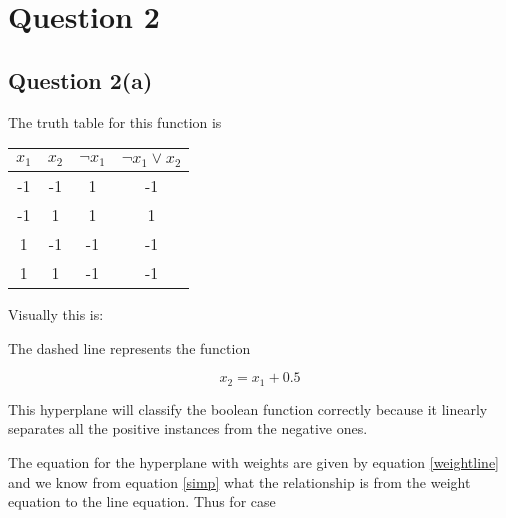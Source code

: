 \documentclass[10pt,a4paper]{article}
\begin{document}
\section{Question 2}
\subsection{Question 2(a)}

The truth table for this function is
 
\begin{tabular}{|c|c|c|c|}
\hline
$x_1$ & $x_2$ & $\neg x_1$ & $\neg x_1 \vee x_2$ \\
\hline
-1 &-1 &1 &-1\\
-1 &1 &1 &1\\
1 &-1 &-1 &-1\\
1 &1 &-1 &-1\\
\hline
\end{tabular}

Visually this is:

\begin{center}
\end{center}

The dashed line represents the function

\begin{equation}
x_2 = x_1 + 0.5
\end{equation}

This hyperplane will classify the boolean function correctly because it linearly separates all the positive instances from the negative ones.

The equation for the hyperplane with weights are given by equation \ref{weightline} and we know from equation \ref{simp} what the relationship is from the weight equation to the line equation. Thus for case
\end{document}
